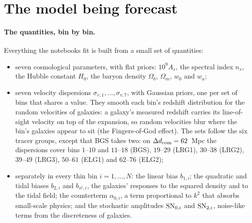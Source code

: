 \documentclass[11pt]{article}
\newcommand{\SNzi}{{\rm SN}_{0,i}}
\newcommand{\SNti}{{\rm SN}_{2,i}}
\begin{document}
\section{The model being forecast}
\label{sec:model}

\paragraph{The quantities, bin by bin.}
Everything the notebooks fit is built from a small set of quantities:
\begin{itemize}
  \item seven cosmological parameters, with flat priors: $10^9 A_s$,
    the spectral index $n_s$, the Hubble constant $H_0$, the baryon
    density $\Omega_b$, $\Omega_m$, $w_0$ and $w_a$;
  \item seven velocity dispersions
    $\sigma_{v,1}, \ldots, \sigma_{v,7}$, with Gaussian priors, one
    per set of bins that shares a value.  They smooth each bin's
    redshift distribution for the random velocities of galaxies: a
    galaxy's measured redshift carries its line-of-sight velocity on
    top of the expansion, so random velocities blur where the bin's
    galaxies appear to sit (the Fingers-of-God effect).  The sets
    follow the six tracer groups,
    except that BGS takes two: on $\Delta d_{\rm com} = 62$~Mpc the
    dispersions cover bins $1$--$10$ and $11$--$18$ (BGS), $19$--$29$
    (LRG1), $30$--$38$ (LRG2), $39$--$49$ (LRG3), $50$--$61$ (ELG1)
    and $62$--$76$ (ELG2);
  \item separately in every thin bin $i = 1, \ldots, N$: the linear
    bias $b_{1,i}$; the quadratic and tidal biases $b_{2,i}$ and
    $b_{s^2,i}$, the galaxies' responses to the squared density and to
    the tidal field; the counterterm $\alpha_{0,i}$, a term
    proportional to $k^2$ that absorbs small-scale physics; and the
    stochastic amplitudes $\SNzi$ and $\SNti$, noise-like terms from
    the discreteness of galaxies.
\end{itemize}
\end{document}
